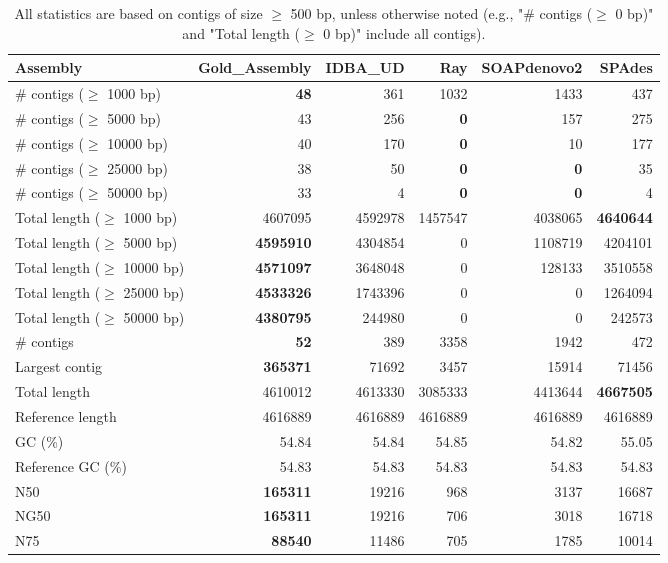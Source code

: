 \documentclass[12pt,a4paper]{article}
\begin{document}
\begin{table}[ht]
\begin{center}
\caption{All statistics are based on contigs of size $\geq$ 500 bp, unless otherwise noted (e.g., "\# contigs ($\geq$ 0 bp)" and "Total length ($\geq$ 0 bp)" include all contigs).}
\begin{tabular}{|l*{5}{|r}|}
\hline
Assembly & Gold\_Assembly & IDBA\_UD & Ray & SOAPdenovo2 & SPAdes \\ \hline
\# contigs ($\geq$ 1000 bp) & {\bf 48} & 361 & 1032 & 1433 & 437 \\ \hline
\# contigs ($\geq$ 5000 bp) & 43 & 256 & {\bf 0} & 157 & 275 \\ \hline
\# contigs ($\geq$ 10000 bp) & 40 & 170 & {\bf 0} & 10 & 177 \\ \hline
\# contigs ($\geq$ 25000 bp) & 38 & 50 & {\bf 0} & {\bf 0} & 35 \\ \hline
\# contigs ($\geq$ 50000 bp) & 33 & 4 & {\bf 0} & {\bf 0} & 4 \\ \hline
Total length ($\geq$ 1000 bp) & 4607095 & 4592978 & 1457547 & 4038065 & {\bf 4640644} \\ \hline
Total length ($\geq$ 5000 bp) & {\bf 4595910} & 4304854 & 0 & 1108719 & 4204101 \\ \hline
Total length ($\geq$ 10000 bp) & {\bf 4571097} & 3648048 & 0 & 128133 & 3510558 \\ \hline
Total length ($\geq$ 25000 bp) & {\bf 4533326} & 1743396 & 0 & 0 & 1264094 \\ \hline
Total length ($\geq$ 50000 bp) & {\bf 4380795} & 244980 & 0 & 0 & 242573 \\ \hline
\# contigs & {\bf 52} & 389 & 3358 & 1942 & 472 \\ \hline
Largest contig & {\bf 365371} & 71692 & 3457 & 15914 & 71456 \\ \hline
Total length & 4610012 & 4613330 & 3085333 & 4413644 & {\bf 4667505} \\ \hline
Reference length & 4616889 & 4616889 & 4616889 & 4616889 & 4616889 \\ \hline
GC (\%) & 54.84 & 54.84 & 54.85 & 54.82 & 55.05 \\ \hline
Reference GC (\%) & 54.83 & 54.83 & 54.83 & 54.83 & 54.83 \\ \hline
N50 & {\bf 165311} & 19216 & 968 & 3137 & 16687 \\ \hline
NG50 & {\bf 165311} & 19216 & 706 & 3018 & 16718 \\ \hline
N75 & {\bf 88540} & 11486 & 705 & 1785 & 10014 \\ \hline

\end{tabular}
\end{center}
\end{table}
\end{document}
